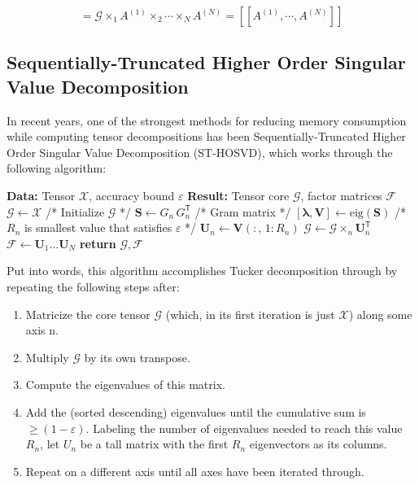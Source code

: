 \documentclass[11pt]{article}
\newcommand\0{\mathbf{0}}
\newcommand\<{\langle}
\renewcommand\>{\rangle}
\begin{document}
$$=\mathcal{G}\times_1 A^{(1)}\times_2 \cdots\times_N A^{(N)}=[[A^{(1)},\cdots,A^{(N)}]]$$

\subsection{Sequentially-Truncated Higher Order Singular Value Decomposition}

In recent years, one of the strongest methods for reducing memory consumption while computing tensor decompositions has been Sequentially-Truncated Higher Order Singular Value Decomposition (ST-HOSVD), which works through the following algorithm:

\begin{algorithm}[H]
  \caption{ST-HOSVD}
  \begin{algorithmic}[1]      %
    \State\textbf{Data:}    Tensor $\mathcal{X}$, accuracy bound $\varepsilon$
    \State \textbf{Result:}  Tensor core $\mathcal{G}$, factor matrices $\mathcal{F}$
    \State $\mathcal{G} \gets \mathcal{X}$  /* Initialize $\mathcal{G}$ */
      \State $\mathbf{S} \gets G_n\,G_n^{\mathsf T}$ /* Gram matrix */
      \State $[\boldsymbol{\lambda}, \mathbf{V}] \gets \mathrm{eig}(\mathbf{S})$ /* $R_n$ is smallest value that satisfies $\varepsilon$ */
      \State $\mathbf{U}_n \gets \mathbf{V}(:,\,1{:}R_n)$
      \State $\mathcal{G} \gets \mathcal{G} \times_{n} \mathbf{U}_n^{\mathsf T}$ 
    \EndFor
    \State $\mathcal{F} \gets \mathbf{U}_1 \dots \mathbf{U}_N$
    \State \textbf{return} $\mathcal{G}, \mathcal{F}$
  \end{algorithmic}
\end{algorithm}

Put into words, this algorithm accomplishes Tucker decomposition through by repeating the following steps after:
\begin{enumerate}
    \item Matricize the core tensor $\mathcal{G}$ (which, in its first iteration is just $\mathcal{X}$) along some axis n.
    \item Multiply $\mathcal{G}$ by its own transpose.
    \item Compute the eigenvalues of this matrix.
    \item Add the (sorted descending) eigenvalues until the cumulative sum is $\geq (1-\varepsilon)$. Labeling the number of eigenvalues needed to reach this value $R_n$, let $U_n$ be a tall matrix with the first $R_n$ eigenvectors as its columns.
    \item Repeat on a different axis until all axes have been iterated through.
\end{enumerate}
\end{document}
